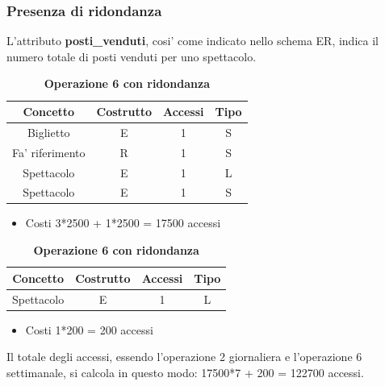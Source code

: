 \documentclass[10pt]{article}
\begin{document}
	\subsubsection{Presenza di ridondanza}
	L'attributo \textbf{posti\_venduti}, cosi' come indicato nello schema ER, indica il numero totale di posti venduti per uno spettacolo.
	\begin{table}[h!]
		\centering
		\caption{\textbf{Operazione 2 con ridondanza}} \label{tab:Op2 ridondanza}
		\begin{tabular}{|c|c|c|c|}
			\hline
			\textbf{Concetto} & \textbf{Costrutto} & \textbf{Accessi} & \textbf{Tipo} \\
			\hline
			Biglietto & E & 1 & S \\
			\hline
			Fa' riferimento & R & 1 & S \\
			\hline
			Spettacolo & E & 1 & L \\
			\hline
			Spettacolo & E & 1 & S \\
			\hline
		\end{tabular}
		\begin{itemize}
			\item Costi 3*2500 + 1*2500 = 17500 accessi 
		\end{itemize}
		\caption{\textbf{Operazione 6 con ridondanza}} \label{tab:Op6 ridondanza}
		\begin{tabular}{|c|c|c|c|}
			\hline
			\textbf{Concetto} & \textbf{Costrutto} & \textbf{Accessi} & \textbf{Tipo} \\
			\hline
			Spettacolo & E & 1 & L \\
			\hline
		\end{tabular}
		\begin{itemize}
		\item Costi 1*200 = 200 accessi 
		\end{itemize}
	\end{table}

	Il totale degli accessi, essendo l'operazione 2 giornaliera e l'operazione 6 settimanale, si calcola in questo modo: 17500*7 + 200 = 122700 accessi.
\end{document}
